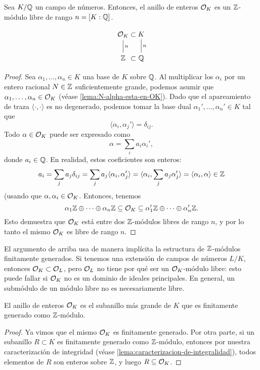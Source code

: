 \begin{teorema}
  Sea $K/\mathbb{Q}$ un campo de números. Entonces, el anillo de enteros $\mathcal{O}_K$
  es un $\mathbb{Z}$-módulo libre de rango $n = [K : \mathbb{Q}]$.

  \[ \begin{tikzcd}
    \O_K \ar[-]{d}{n} &[-3em] \subset &[-3em] K \ar[-]{d}{n} \\
    \ZZ & \subset & \QQ
  \end{tikzcd} \]

  \begin{proof}
    Sea $\alpha_1,\ldots,\alpha_n \in K$ una base de $K$ sobre $\mathbb{Q}$.
    Al multiplicar los $\alpha_i$ por un entero racional $N \in \mathbb{Z}$
    suficientemente grande, podemos asumir que
    $\alpha_1,\ldots,\alpha_n \in \mathcal{O}_K$ (véase \ref{lema:N-alpha-esta-en-OK}).
    Dado que el apareamiento de traza $\langle\cdot,\cdot\rangle$
    es no degenerado, podemos tomar la base dual
    $\alpha_1',\ldots,\alpha_n' \in K$ tal que
    $$\langle \alpha_i, \alpha_j'\rangle = \delta_{ij}.$$
    Todo $\alpha \in \mathcal{O}_K$ puede ser expresado como
    $$\alpha = \sum_i a_i \alpha_i',$$
    donde $a_i \in \mathbb{Q}$. En realidad, estos coeficientes son enteros:
    \[ a_i = \sum_j a_j \delta_{ij} =
       \sum_j a_j \langle\alpha_i, \alpha_j'\rangle =
       \langle\alpha_i, \sum_j a_j \alpha_j'\rangle =
       \langle\alpha_i, \alpha\rangle \in \mathbb{Z} \]
    (usando que $\alpha,\alpha_i \in \mathcal{O}_K$. Entonces, tenemos
    \[ \alpha_1 \mathbb{Z} \oplus \cdots \oplus \alpha_n \mathbb{Z} \subseteq \mathcal{O}_K \subseteq
       \alpha_1' \mathbb{Z} \oplus \cdots \oplus \alpha_n' \mathbb{Z}. \]
    Esto demuestra que $\mathcal{O}_K$ está entre dos $\mathbb{Z}$-módulos libres de rango $n$,
    y por lo tanto el mismo $\mathcal{O}_K$ es libre de rango $n$.
  \end{proof}
\end{teorema}

\begin{comentario}
  El argumento de arriba usa de manera implícita la estructura de $\mathbb{Z}$-módulos
  finitamente generados. Si tenemos una extensión de campos de números $L/K$,
  entonces $\mathcal{O}_K \subset \mathcal{O}_L$, pero $\mathcal{O}_L$ no tiene por qué ser un
  $\mathcal{O}_K$-módulo libre: esto puede fallar si $\mathcal{O}_K$ no es un dominio de ideales
  principales. En general, un submódulo de un módulo libre no es necesariamente
  libre.
\end{comentario}

\begin{corolario}
  El anillo de enteros $\mathcal{O}_K$ es el subanillo más grande de $K$ que es
  finitamente generado como $\mathbb{Z}$-módulo.

  \begin{proof}
    Ya vimos que el mismo $\mathcal{O}_K$ es finitamente generado. Por otra parte, si
    un subanillo $R \subset K$ es finitamente generado como $\mathbb{Z}$-módulo,
    entonces por nuestra caracterización de integridad
    (véase \ref{lema:caracterizacion-de-integralidad}), todos elementos de $R$
    son enteros sobre $\mathbb{Z}$, y luego $R \subseteq \mathcal{O}_K$.
  \end{proof}
\end{corolario}

